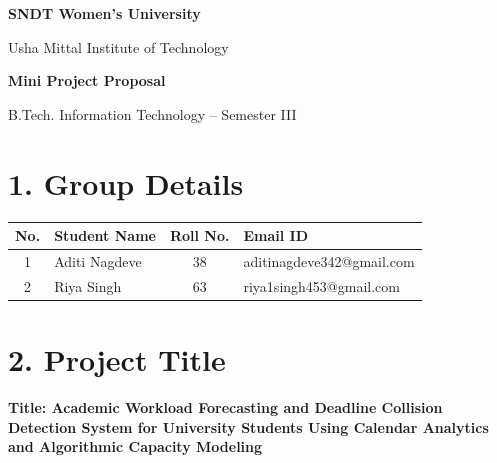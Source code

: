 \documentclass[11pt,a4paper]{article}
\begin{document}

\begin{center}

{\Large \textbf{SNDT Women's University}}

\vspace{2mm}

{\large Usha Mittal Institute of Technology}

\vspace{2mm}

{\Large \textbf{Mini Project Proposal}}

\vspace{1mm}

{\large B.Tech. Information Technology -- Semester III}

\vspace{2mm}

\end{center}

\vspace{4mm}



\section*{1. Group Details}

\begin{tabularx}{\linewidth}{|c|X|c|X|}
\hline
No. & Student Name & Roll No. & Email ID \\
\hline
1 & Aditi Nagdeve & 38 & aditinagdeve342@gmail.com \\
\hline
2 & Riya Singh & 63 & riya1singh453@gmail.com \\
\hline
\end{tabularx}



\section*{2. Project Title}

\textbf{Title: Academic Workload Forecasting and Deadline Collision Detection System for University Students Using Calendar Analytics and Algorithmic Capacity Modeling}
\end{document}
